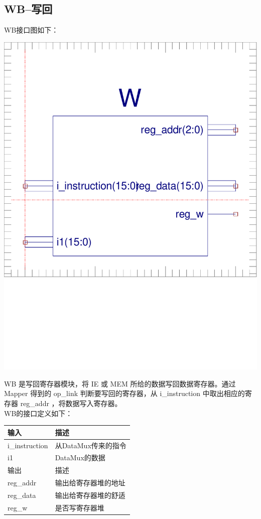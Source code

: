 \documentclass[10pt]{article}
\begin{document}
\begin{CJK}{UTF8}{gbsn}
\subsection{WB--写回}
WB接口图如下：\\
\begin{center}
\includegraphics[width=0.5\linewidth]{WB.pdf}
\end{center}
WB 是写回寄存器模块，将 IE 或 MEM 所给的数据写回数据寄存器。通过 Mapper 得到的 op\_link 判断要写回的寄存器，从 i\_instruction 
中取出相应的寄存器 reg\_addr ，将数据写入寄存器。\\
WB的接口定义如下：\\
\begin{center}
\begin{tabular}{|l|l|}\hline
输入&描述\\\hline
i\_instruction&从DataMux传来的指令\\\hline
i1&DataMux的数据\\\hline\hline
输出&描述\\\hline
reg\_addr&输出给寄存器堆的地址\\\hline
reg\_data&输出给寄存器堆的舒适\\\hline
reg\_w&是否写寄存器堆\\\hline
\end{tabular}
\end{center}


\end{CJK}
\end{document}
